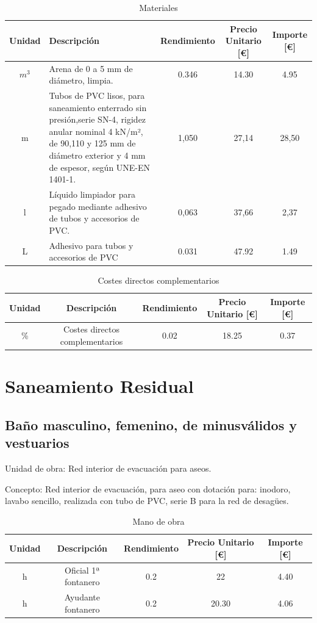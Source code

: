 \documentclass[../main.tex]{subfiles}
\begin{document}
\begin{table}[H]
    \centering
    \begin{tabular}{c|p{5.5cm}|c|c|c}
    Unidad & Descripción & Rendimiento & Precio Unitario [€] & Importe [€] \\ \hline
    $m^3$ & Arena de 0 a 5 mm de diámetro, limpia.& 0.346 & 14.30 & 4.95 \\ 
    m & Tubos de PVC lisos, para saneamiento enterrado sin presión,serie SN-4, rigidez anular nominal 4 kN/m², de 90,110 y 125 mm de diámetro exterior y 4 mm de espesor, según UNE-EN 1401-1. &1,050 & 27,14 & 28,50 \\
    l & Líquido limpiador para pegado mediante adhesivo de tubos y accesorios de PVC. & 0,063 & 37,66 & 2,37 \\
    L & Adhesivo para tubos y accesorios de PVC & 0.031 & 47.92 & 1.49 \\
    \end{tabular}
    \caption{Materiales}
\end{table}

\begin{table}[H]
    \centering
    \begin{tabular}{c|c|c|c|c}
    Unidad & Descripción & Rendimiento & Precio Unitario [€] & Importe [€] \\ \hline
    \% & Costes directos complementarios & 0.02 & 18.25 & 0.37 \\
    \end{tabular}
    \caption{Costes directos complementarios}
\end{table} 

\section{Saneamiento Residual}

\subsection{Baño masculino, femenino, de minusválidos y vestuarios}

Unidad de obra: Red interior de evacuación para aseos.

Concepto: Red interior de evacuación, para aseo con dotación para: inodoro, lavabo sencillo, realizada con tubo de PVC, serie B para la red de desagües.

\begin{table}[H]
    \centering
    \begin{tabular}{c|c|c|c|c}
    Unidad & Descripción & Rendimiento & Precio Unitario [€] & Importe [€] \\ \hline
    h&Oficial 1ª fontanero & 0.2 & 22 & 4.40 \\
    h&Ayudante fontanero & 0.2 & 20.30 & 4.06 \\
    
    \end{tabular}
    \caption{Mano de obra}
\end{table}
\end{document}
